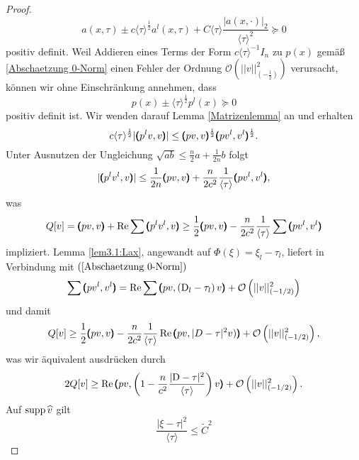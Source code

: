 \begin{proof}
\begin{equation}
	a(x,\tau) \pm c\langle\tau\rangle^{\frac{1}{2}}a^l(x,\tau)+C\langle\tau\rangle \frac{| a(x,\cdot)|_{2}}{\langle\tau\rangle^2}\succeq 0
\end{equation}
positiv definit. Weil Addieren eines Terms der Form $c \langle\tau\rangle^{-1} I_n$ zu $p(x)$ gemäß \eqref{Abschaetzung 0-Norm} einen Fehler der Ordnung $\mathcal O\left(\vert\vert v\vert\vert_{\left(-\frac{1}{2}\right)}^2\right)$ verursacht, können wir ohne Einschränkung annehmen, dass  
\begin{equation}
	p(x) \pm \langle\tau\rangle^{\frac{1}{2}}p^l(x) \succeq 0
\end{equation}
positiv definit ist. Wir wenden darauf Lemma \ref{Matrizenlemma} an und erhalten
\begin{equation}
	c\langle\tau\rangle^{\frac{1}{2}} |\pmb(p^lv,v\pmb)|\le\pmb(pv,v\pmb)^{\frac{1}{2}}\pmb(pv^l,v^l\pmb)^{\frac{1}{2}}.
\end{equation}
Unter Ausnutzen der Ungleichung $\sqrt{ab}\le \frac{n}{2}a+\frac{1}{2n}b$ folgt
\begin{equation}
	|\pmb(p^lv^l,v\pmb)|\le \frac{1}{2n}\pmb(pv,v\pmb)+\frac{n}{2c^2}\frac{1}{\langle\tau\rangle}\pmb(pv^l,v^l\pmb),
\end{equation}
was
\begin{equation}
	Q[ v]=\pmb(pv,v\pmb)+\operatorname{Re}\sum\pmb(p^lv^l,v\pmb) \ge \frac{1}{2}\pmb(pv,v\pmb) -\frac{n}{2c^2}\frac{1}{\langle\tau\rangle}\sum\pmb(pv^l,v^l\pmb)
\end{equation}
impliziert. Lemma \ref{lem3.1:Lax}, angewandt auf $\Phi(\xi) = \xi_l-\tau_l$, liefert in Verbindung mit $(\ref{Abschaetzung 0-Norm})$
\begin{equation}
\sum\pmb(pv^l,v^l\pmb)=\operatorname{Re}\sum \pmb(pv,\left(\mathrm D_l-\tau_l\right)v\pmb)+\mathcal{O}\left(|| v||_{\left(-{1}/{2}\right)}^2\right) 
\end{equation}
und damit
\begin{equation}
	Q[v] \ge \frac{1}{2}\pmb(pv,v\pmb)-\frac{n}{2c^2}\frac{1}{\langle\tau\rangle}\operatorname{Re}\pmb(pv,| D-\tau|^2v)\pmb)+\mathcal{O}\left(|| v||_{\left(-{1}/{2}\right)}^2\right),
\end{equation}
was wir äquivalent ausdrücken durch
\begin{equation}
	2Q[v] \ge \operatorname{Re}\pmb(pv,\left(1-\frac{n}{c^2}\frac{| \mathrm D-\tau|^2}{\langle\tau\rangle}\right)v\pmb)+\mathcal{O}\left(|| v||_{\left(-{1}/{2}\right)}^2\right).
\end{equation}
Auf $\operatorname{supp}\widehat{v}$ gilt
\begin{equation}
	\frac{|\xi-\tau|^2}{\langle\tau\rangle}\le \tilde{C}^2 

\end{equation}
\end{proof}
